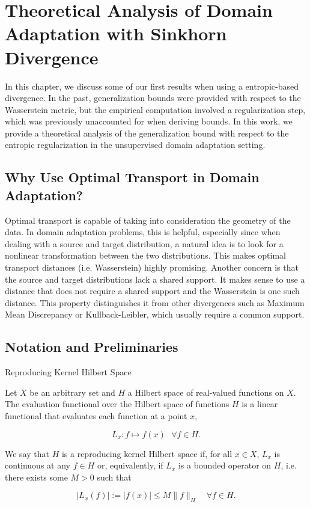 \chapter{Theoretical Analysis of Domain Adaptation with Sinkhorn Divergence}

In this chapter, we discuss some of our first results when using a entropic-based divergence. In the past, generalization bounds were provided with respect to the Wasserstein metric, but the empirical computation involved a regularization step, which was previously unaccounted for when deriving bounds. In this work, we provide a theoretical analysis of the generalization bound with respect to the entropic regularization in the unsupervised domain adaptation setting.

\section*{Why Use Optimal Transport in Domain Adaptation?}
Optimal transport is capable of taking into consideration the geometry of the data. In domain adaptation problems, this is helpful, especially since when dealing with a source and target distribution, a natural idea is to look for a nonlinear transformation between the two distributions. This makes optimal transport distances (i.e. Wasserstein) highly promising. Another concern is that the source and target distributions lack a shared support. It makes sense to use a distance that does not require a shared support and the Wasserstein is one such distance. This property distinguishes it from other divergences such as Maximum Mean Discrepancy or Kullback-Leibler, which usually require a common support.

\section{Notation and Preliminaries}

\begin{definition}{Reproducing Kernel Hilbert Space}
	
	Let $X$ be an arbitrary set and $H$ a Hilbert space of real-valued functions on $X$.  The evaluation functional over the Hilbert space of functions $H$ is a linear functional that evaluates each function at a point $x$,
	
	\[
	L_{x} : f \mapsto f(x)  \text{   } \forall f \in H.
	\]
	
	We say that $H$ is a reproducing kernel Hilbert space if, for all $x \in X$, $L_{x}$ is continuous at any $f\in H$ or, equivalently, if $L_x$ is a bounded operator on $H$, i.e. there exists some $M > 0$ such that
	
	\[
	|L_{x}(f)| := |f(x)| \le M \|f\|_H \quad \forall f \in H.
	\]

\end{definition}

